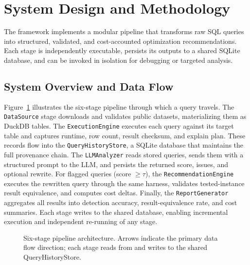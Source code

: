 \documentclass[conference]{IEEEtran}
\begin{document}
\section{System Design and Methodology}
The framework implements a modular pipeline that transforms raw SQL queries into structured, validated, and cost-accounted optimization recommendations. Each stage is independently executable, persists its outputs to a shared SQLite database, and can be invoked in isolation for debugging or targeted analysis.

\subsection{System Overview and Data Flow}
Figure~\ref{fig:architecture} illustrates the six-stage pipeline through which a query travels. The \texttt{DataSource} stage downloads and validates public datasets, materializing them as DuckDB tables. The \texttt{ExecutionEngine} executes each query against its target table and captures runtime, row count, result checksum, and explain plan. These records flow into the \texttt{QueryHistoryStore}, a SQLite database that maintains the full provenance chain. The \texttt{LLMAnalyzer} reads stored queries, sends them with a structured prompt to the LLM, and persists the returned score, issues, and optional rewrite. For flagged queries (score $\geq \tau$), the \texttt{RecommendationEngine} executes the rewritten query through the same harness, validates tested-instance result equivalence, and computes cost deltas. Finally, the \texttt{ReportGenerator} aggregates all results into detection accuracy, result-equivalence rate, and cost summaries. Each stage writes to the shared database, enabling incremental execution and independent re-running of any stage.

\begin{figure}[t]
\centering
{}
\caption{Six-stage pipeline architecture. Arrows indicate the primary data flow direction; each stage reads from and writes to the shared QueryHistoryStore.}
\label{fig:architecture}
\end{figure}
\end{document}
